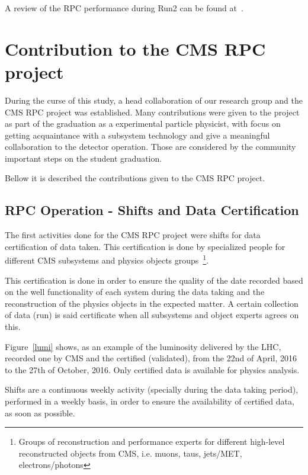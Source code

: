 A review of the RPC performance during Run2 can be found at~\cite{rpc_run2_performance}.

\section{Contribution to the CMS RPC project}

During the curse of this study, a head collaboration of our research group and the CMS RPC project was established. Many contributions were given to the project as part of the graduation as a experimental particle physicist, with focus on getting acquaintance with a subsystem technology and give a meaningful collaboration to the detector operation.  Those are considered by the community important steps on the student graduation.

Bellow it is described the contributions given to the CMS RPC project.

\subsection{RPC Operation - Shifts and Data Certification}

The first activities done for the CMS RPC project were shifts for data certification of data taken. This certification is done by specialized people for different CMS subsystems and physics objects groups~\footnote{Groups of reconstruction and performance experts for different high-level reconstructed objects from CMS, i.e. muons, taus, jets/MET, electrons/photons}. 
 
This certification is done in order to ensure the quality of the date recorded based on the well functionality of each system during the data taking and the reconstruction of the physics objects in the expected matter. A certain collection of data (run) is said certificate when all subsystems and object experts agrees on this.

Figure~\ref{lumi} shows, as an example of the luminosity delivered by the LHC, recorded one by CMS and the certified (validated), from the 22nd of April, 2016 to the 27th of October, 2016. Only certified data is available for physics analysis.

Shifts are a continuous weekly activity (specially during the data taking period), performed in a weekly basis, in order to ensure the availability of certified data, as soon as possible.
 
  

